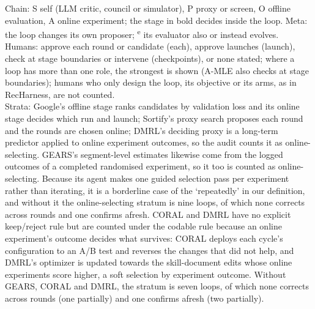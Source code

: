 \documentclass[sigconf,nonacm]{acmart}
\begin{document}
\begin{table}[t]
\smallskip\raggedright\footnotesize
Chain: S self (LLM critic, council or simulator), P proxy or screen, O offline
evaluation, A online experiment; the stage in bold decides inside the loop. Meta: the loop changes its own proposer;
\textsuperscript{e} its evaluator also or instead evolves.
Humans: approve each round or candidate (each), approve launches (launch), check at stage boundaries or intervene
(checkpoints), or none stated; where a loop has more than one role, the strongest is shown (A-MLE also checks at stage boundaries); humans who only design the loop, its objective or its arms, as in RecHarness, are not counted.\\
Strata: Google's offline stage ranks candidates by validation loss and its online stage decides which run and launch; Sortify's proxy search
proposes each round and the rounds are chosen online; DMRL's deciding proxy is a long-term predictor applied to online
experiment outcomes, so the audit counts it as online-selecting. GEARS's segment-level estimates likewise come from the logged outcomes of a completed randomised experiment, so it too is counted as online-selecting. Because its agent makes one guided selection pass per experiment rather than iterating, it is a borderline case of the `repeatedly' in our definition, and without it the online-selecting stratum is nine loops, of which none corrects across rounds and one confirms afresh. CORAL and DMRL have no explicit keep/reject rule but are counted under the codable rule because an online experiment's outcome decides what survives: CORAL deploys each cycle's configuration to an A/B test and reverses the changes that did not help, and DMRL's optimizer is updated towards the skill-document edits whose online experiments score higher, a soft selection by experiment outcome. Without GEARS, CORAL and DMRL, the stratum is seven loops, of which none corrects across rounds (one partially) and one confirms afresh (two partially).
\end{table}
\end{document}
